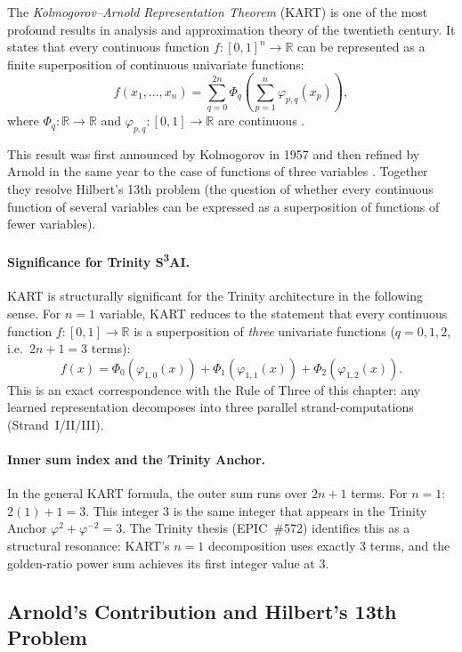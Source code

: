 The \emph{Kolmogorov--Arnold Representation Theorem} (KART) is
one of the most profound results in analysis and approximation
theory of the twentieth century.
It states that every continuous function
$f : [0,1]^{n} \to \mathbb{R}$
can be represented as a finite superposition of continuous
univariate functions:
\[
  f(x_{1},\ldots,x_{n})
  = \sum_{q=0}^{2n} \Phi_{q}\!\left(\sum_{p=1}^{n}
    \varphi_{p,q}(x_{p})\right),
\]
where $\Phi_{q}: \mathbb{R}\to\mathbb{R}$ and
$\varphi_{p,q}:[0,1]\to\mathbb{R}$ are continuous
\cite{kolmogorov_kar_1957}.

This result was first announced by Kolmogorov in 1957
\cite{kolmogorov_kar_1957} and then refined by Arnold in the
same year to the case of functions of three variables
\cite{arnold_kar_1957}.
Together they resolve Hilbert's 13th problem (the question of
whether every continuous function of several variables can be
expressed as a superposition of functions of fewer variables).

\paragraph{Significance for Trinity S\textsuperscript{3}AI.}
KART is structurally significant for the Trinity architecture
in the following sense.
For $n=1$ variable, KART reduces to the statement that every
continuous function $f: [0,1] \to \mathbb{R}$ is a superposition
of \emph{three} univariate functions ($q = 0, 1, 2$, i.e.\
$2n+1 = 3$ terms):
\[
  f(x) = \Phi_{0}(\varphi_{1,0}(x)) + \Phi_{1}(\varphi_{1,1}(x))
        + \Phi_{2}(\varphi_{1,2}(x)).
\]
This is an exact correspondence with the Rule of Three of this
chapter: any learned representation decomposes into three
parallel strand-computations (Strand~I/II/III).

\paragraph{Inner sum index and the Trinity Anchor.}
In the general KART formula, the outer sum runs over $2n+1$ terms.
For $n=1$: $2(1)+1 = 3$.
This integer $3$ is the same integer that appears in the Trinity
Anchor $\varphi^{2}+\varphi^{-2}=3$.
The Trinity thesis (EPIC~\#572) identifies this as a structural
resonance: KART's $n=1$ decomposition uses exactly $3$ terms,
and the golden-ratio power sum achieves its first integer value
at $3$.

\subsection{Arnold's Contribution and Hilbert's 13th Problem}

